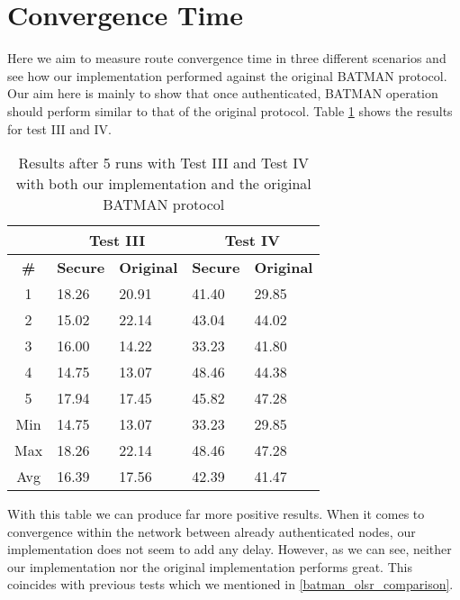 \section{Convergence Time}
Here we aim to measure route convergence time in three different scenarios and see how our implementation performed against the original BATMAN protocol. Our aim here is mainly to show that once authenticated, BATMAN operation should perform similar to that of the original protocol. Table \ref{tab:conv_time_test_result} shows the results for test III and IV.

\begin{table}[ht!]
	\centering
	\begin{tabular}{ | c | l | l || l | l | }
	\hline
	& \multicolumn{2}{|c||}{\textbf{Test III}} & \multicolumn{2}{c|}{\textbf{Test IV}}\\ \hline
	\textbf{\#} & \textbf{Secure} & \textbf{Original} & \textbf{Secure} & \textbf{Original}\\ \hline
		1 & 18.26 & 20.91 & 41.40 & 29.85 \\ \hline
		2 & 15.02 & 22.14 & 43.04 & 44.02 \\ \hline
		3 & 16.00 & 14.22 & 33.23 & 41.80 \\ \hline
		4 & 14.75 & 13.07 & 48.46 & 44.38 \\ \hline
		5 & 17.94 & 17.45 & 45.82 & 47.28 \\ \hline \hline
		Min & 14.75 & 13.07 & 33.23 & 29.85 \\ \hline
		Max & 18.26 & 22.14 & 48.46 & 47.28 \\ \hline
		Avg & 16.39 & 17.56 & 42.39 & 41.47 \\ \hline
	\end{tabular}
	\caption{Results after 5 runs with Test III and Test IV with both our implementation and the original BATMAN protocol}
	\label{tab:conv_time_test_result}
\end{table}

\noindent
With this table we can produce far more positive results. When it comes to convergence within the network between already authenticated nodes, our implementation does not seem to add any delay. However, as we can see, neither our implementation nor the original implementation performs great. This coincides with previous tests which we mentioned in \ref{batman_olsr_comparison}.


